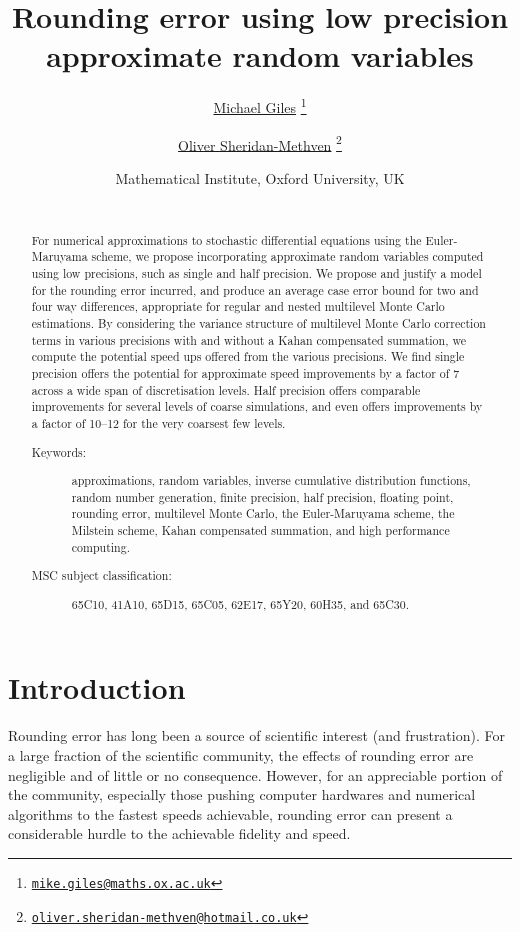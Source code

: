 \documentclass[9pt,a4paper,english]{extarticle}
\title{\Huge Rounding error using low precision approximate random variables}
\author{
\href{mailto:mike.giles@maths.ox.ac.uk}{Michael Giles}%
\thanks{\href{mailto:mike.giles@maths.ox.ac.uk}%
{\texttt{mike.giles@maths.ox.ac.uk}}} 
\and 
\href{mailto:oliver.sheridan-methven@hotmail.co.uk}{Oliver Sheridan-Methven}%
\thanks{\href{mailto:oliver.sheridan-methven@hotmail.co.uk}%
{\texttt{oliver.sheridan-methven@hotmail.co.uk}}}
}
\date{
Mathematical Institute, Oxford University, UK\\[1em]
\datedayname\ \nth{\number\day} \monthname\  \number\year}
\begin{document}
\maketitle

\begin{abstract}
For numerical approximations to stochastic differential equations using the Euler-Maruyama scheme, we propose incorporating approximate random variables computed using low precisions, such as single and half precision. We propose and justify a model for the rounding error incurred, and produce an average case error bound for two and four way differences, appropriate for regular and nested multilevel Monte Carlo estimations. By considering the variance structure of  multilevel Monte Carlo correction terms in various precisions with and without a Kahan compensated summation, we compute the potential speed ups offered from the various precisions. We find single precision offers the potential for approximate speed improvements by a factor of 7 across a wide span of discretisation levels. Half precision offers comparable improvements for several levels of coarse simulations, and even offers improvements by a factor of 10--12 for the very coarsest few levels. 

\begin{description}
\item[Keywords:] approximations, random variables, inverse cumulative distribution functions, random number generation, finite precision, half precision, floating point, rounding error, multilevel Monte Carlo, the Euler-Maruyama scheme, the Milstein scheme, Kahan compensated summation, and high performance computing.
\item[MSC subject classification:] 	65C10, 41A10, 65D15, 65C05, 62E17, 65Y20, 60H35, and 65C30.
\end{description}
\end{abstract}


\section{Introduction}
\label{sec:introduction}

Rounding error has long been a source of scientific interest (and frustration). For a large fraction of the scientific community, the effects of rounding error are negligible and of little or no consequence. However, for an appreciable portion of the community, especially those pushing computer hardwares and numerical algorithms to the fastest speeds achievable, rounding error can present a considerable hurdle to the achievable fidelity and speed.
\end{document}
